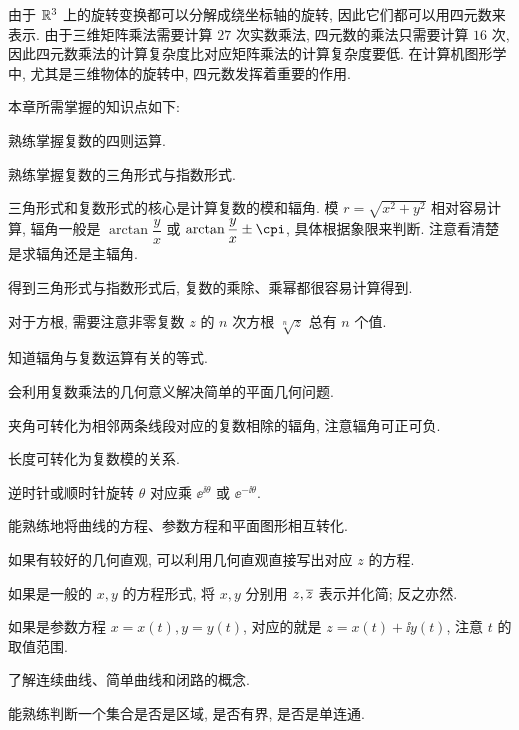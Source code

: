 由于 ${\mathbb{R}}^3$ 上的旋转变换都可以分解成绕坐标轴的旋转, 因此它们都可以用四元数来表示.
由于三维矩阵乘法需要计算 $27$ 次实数乘法, 四元数的乘法只需要计算 $16$ 次, 因此四元数乘法的计算复杂度比对应矩阵乘法的计算复杂度要低.
在计算机图形学中, 尤其是三维物体的旋转中, 四元数发挥着重要的作用.



本章所需掌握的知识点如下:
\begin{conclusion}
  \item 熟练掌握复数的四则运算.
  \item 熟练掌握复数的三角形式与指数形式.
  \begin{conclusion}
    \item 三角形式和复数形式的核心是计算复数的模和辐角.
    模 $r=\sqrt{x^2+y^2}$ 相对容易计算, 辐角一般是 $\arctan \dfrac yx$ 或 $\arctan \dfrac yx\pm\cpi$, 具体根据象限来判断.
    注意看清楚是求辐角还是主辐角.
    \item 得到三角形式与指数形式后, 复数的乘除、乘幂都很容易计算得到.
    \item 对于方根, 需要注意非零复数 $z$ 的 $n$ 次方根 $\sqrt[n]{z}$ 总有 $n$ 个值.
    \item 知道辐角与复数运算有关的等式.
  \end{conclusion}
  \item 会利用复数乘法的几何意义解决简单的平面几何问题.
  \begin{conclusion}
    \item 夹角可转化为相邻两条线段对应的复数相除的辐角, 注意辐角可正可负.
    \item 长度可转化为复数模的关系.
    \item 逆时针或顺时针旋转 $
    \theta$ 对应乘 $\ee^{\ii\theta}$ 或 $\ee^{-\ii\theta}$.
  \end{conclusion}
  \item 能熟练地将曲线的方程、参数方程和平面图形相互转化.
  \begin{conclusion}
    \item 如果有较好的几何直观, 可以利用几何直观直接写出对应 $z$ 的方程.
    \item 如果是一般的 $x,y$ 的方程形式, 将 $x,y$ 分别用 $z,\overline z$ 表示并化简; 反之亦然.
    \item 如果是参数方程 $x=x(t),y=y(t)$, 对应的就是 $z=x(t)+\ii y(t)$, 注意 $t$ 的取值范围.
  \end{conclusion}
  \item 了解连续曲线、简单曲线和闭路的概念.
  \item 能熟练判断一个集合是否是区域, 是否有界, 是否是单连通.

\end{conclusion}

